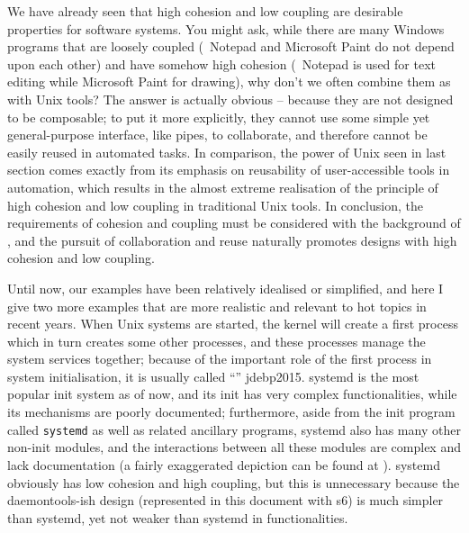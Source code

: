 We have already seen that high cohesion and low coupling are desirable
properties for software systems.  You might ask, while there are many Windows
programs that are loosely coupled (\eg~Notepad and Microsoft Paint do not
depend upon each other) and have somehow high cohesion (\eg~Notepad is used
for text editing while Microsoft Paint for drawing), why don't we often combine
them as with Unix tools?  The answer is actually obvious -- because they are
not designed to be composable; to put it more explicitly, they cannot use some
simple yet general-purpose interface, like pipes, to collaborate, and therefore
cannot be easily reused in automated tasks.  In comparison, the power of
Unix seen in last section comes exactly from its emphasis on reusability of
user-accessible tools in automation, which results in the almost extreme
realisation of the principle of high cohesion and low coupling in traditional
Unix tools.  In conclusion, the requirements of cohesion
and coupling must be considered with the background of , and the pursuit of collaboration and reuse naturally
promotes designs with high cohesion and low coupling.

Until now, our examples have been relatively idealised or simplified, and here
I give two more examples that are more realistic and relevant to hot topics in
recent years.  When Unix systems are started, the kernel will create a first
process which in turn creates some other processes, and these processes manage
the system services together; because of the important role of the first process
in system initialisation, it is usually called ``''\cupercite%
{jdebp2015}.  systemd is the most popular init system as of now, and its init
has very complex functionalities, while its mechanisms are poorly documented;
furthermore, aside from the init program called \verb|systemd| as well as
related ancillary programs, systemd also has many other non-init modules, and
the interactions between all these modules are complex and lack documentation
(a fairly exaggerated depiction can be found at \parencite{litt2014b}).
systemd obviously has low cohesion and high coupling, but this is unnecessary
because the daemontools-ish design (represented in this document with s6) is
much simpler than systemd, yet not weaker than systemd in functionalities.

